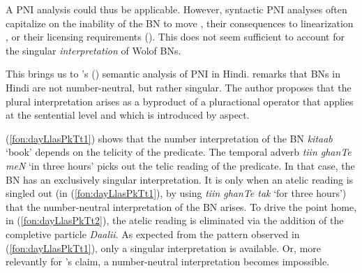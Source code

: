 \documentclass[output=paper]{langscibook}
\begin{document}
\noindent   A PNI analysis could thus be applicable. However, syntactic PNI analyses often capitalize on the inability of the BN to move \citep{massam2001pseudo}, their consequences to linearization \citep{baker2014pseudo}, or their licensing requirements (\citealt{levin2015licensing}). This does not seem sufficient to account for the singular \textit{interpretation} of Wolof BNs.
	
This brings us to \citeauthor{dayal2011hindi}'s (\citeyear{dayal2011hindi}) semantic analysis of PNI in Hindi. \citeauthor{dayal2011hindi} remarks that BNs in Hindi are not number-neutral, but rather singular. The author proposes that the plural interpretation arises as a byproduct of a pluractional operator that applies at the sentential level and which is introduced by aspect.
		
		
			\ea
					\label{fon:dayLlasPkTt1}
						
					    \z
				
					\label{fon:dayLlasPkTt2}
			\z\label{fon:dayLlasPkTt3Ol}
		\z
		
\noindent   (\ref{fon:dayLlasPkTt1}) shows that the number interpretation of the BN \textit{kitaab} `book' depends on the telicity of the predicate. The temporal adverb \textit{tiin ghanTe meN} `in three hours' picks out the telic reading of the predicate. In that case, the BN has an exclusively singular interpretation. It is only when an atelic reading is singled out (in (\ref{fon:dayLlasPkTt1}), by using \textit{tiin ghanTe tak} `for three hours') that the number-neutral interpretation of the BN arises. To drive the point home, in (\ref{fon:dayLlasPkTt2}), the atelic reading is eliminated via the addition of the completive particle \textit{Daalii}. As expected from the pattern observed in (\ref{fon:dayLlasPkTt1}), only a singular interpretation is available. Or, more relevantly for \citeauthor{dayal2011hindi}'s claim, a number-neutral interpretation becomes impossible.
			
\end{document}
